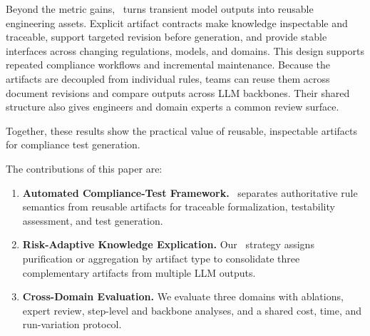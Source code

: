 Beyond the metric gains, \ourtool\ turns transient model outputs into reusable
engineering assets. Explicit artifact contracts make knowledge inspectable and
traceable, support targeted revision before generation, and provide stable
interfaces across changing regulations, models, and domains. This design
supports repeated compliance workflows and incremental maintenance. Because the
artifacts are decoupled from individual rules, teams can reuse them across
document revisions and compare outputs across LLM backbones. Their shared
structure also gives engineers and domain experts a common review surface.

Together, these results show the practical value of reusable, inspectable
artifacts for compliance test generation.

The contributions of this paper are:
\begin{enumerate}[leftmargin=*,align=left,label=(\arabic*), itemsep=0pt, parsep=0pt, nosep]
    \item \textbf{Automated Compliance-Test Framework.}
    \ourtool\ separates authoritative rule semantics from reusable artifacts
    for traceable formalization, testability assessment, and test generation.

    \item \textbf{Risk-Adaptive Knowledge Explication.}
    Our \strategy\ strategy assigns purification or aggregation by artifact type
    to consolidate three complementary artifacts from multiple LLM outputs.

    \item \textbf{Cross-Domain Evaluation.}
    We evaluate three domains with ablations, expert review, step-level and
    backbone analyses, and a shared cost, time, and run-variation protocol.
\end{enumerate}
